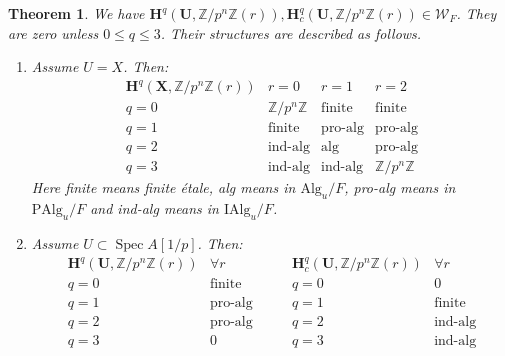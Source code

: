 \documentclass{amsart}
\newtheorem{Thm}{Theorem}[section]
\theoremstyle{remark}
\numberwithin{equation}{section}
\newcommand{\Z}{\mathbb{Z}}
\newcommand{\Alg}{\mathrm{Alg}}
\newcommand{\Ind}{\mathrm{I}}
\newcommand{\Pro}{\mathrm{P}}
\newcommand{\alg}[1]{\mathbf{#1}}
\DeclareMathOperator{\Spec}{Spec}
\begin{document}
\begin{Thm} \label{0077}
	We have $\alg{H}^{q}(\alg{U}, \Z / p^{n} \Z(r)),
	\alg{H}^{q}_{c}(\alg{U}, \Z / p^{n} \Z(r)) \in \mathcal{W}_{F}$.
	They are zero unless $0 \le q \le 3$.
	Their structures are described as follows.
	\begin{enumerate}
		\item
			Assume $U = X$.
			Then:
				\[
					\begin{array}{c|ccc}
							\alg{H}^{q}(\alg{X}, \Z / p^{n} \Z(r))
						&
							r = 0
						&
							r = 1
						&
							r = 2
						\\ \hline
							q = 0
						&
							\Z / p^{n} \Z
						&
							\text{finite}
						&
							\text{finite}
						\\
							q = 1
						&
							\text{finite}
						&
							\text{pro-alg}
						&
							\text{pro-alg}
						\\
							q = 2
						&
							\text{ind-alg}
						&
							\text{alg}
						&
							\text{pro-alg}
						\\
							q = 3
						&
							\text{ind-alg}
						&
							\text{ind-alg}
						&
							\Z / p^{n} \Z
					\end{array}
				\]
			Here finite means finite \'etale,
			alg means in $\Alg_{u} / F$,
			pro-alg means in $\Pro \Alg_{u} / F$
			and ind-alg means in $\Ind \Alg_{u} / F$.
		\item
			Assume $U \subset \Spec A[1 / p]$.
			Then:
				\[
					\begin{array}{c|c}
							\alg{H}^{q}(\alg{U}, \Z / p^{n} \Z(r))
						&
							\forall r
						\\ \hline
							q = 0
						&
							\text{finite}
						\\
							q = 1
						&
							\text{pro-alg}
						\\
							q = 2
						&
							\text{pro-alg}
						\\
							q = 3
						&
							0
					\end{array}
					\qquad
					\begin{array}{c|c}
							\alg{H}^{q}_{c}(\alg{U}, \Z / p^{n} \Z(r))
						&
							\forall r
						\\ \hline
							q = 0
						&
							0
						\\
							q = 1
						&
							\text{finite}
						\\
							q = 2
						&
							\text{ind-alg}
						\\
							q = 3
						&
							\text{ind-alg}
					\end{array}
\]
\end{enumerate}
\end{Thm}
\end{document}
